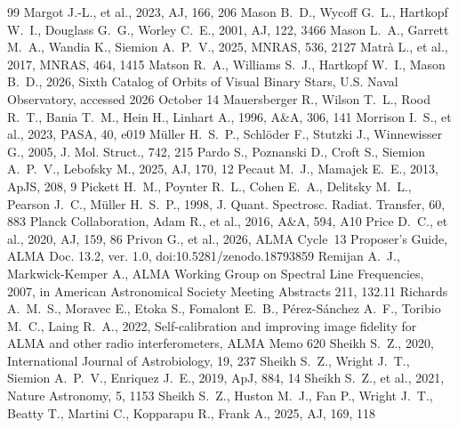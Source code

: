 \documentclass[twocolumn,twocolappendix,numberedappendix,appendixfloats]{openjournal}
\begin{document}
\begin{thebibliography}{99}
 Margot J.-L., et al., 2023, AJ, 166, 206
 Mason B.~D., Wycoff G.~L., Hartkopf W.~I., Douglass G.~G., Worley C.~E., 2001, AJ, 122, 3466
 Mason L.~A., Garrett M.~A., Wandia K., Siemion A.~P.~V., 2025, MNRAS, 536, 2127
 Matrà L., et al., 2017, MNRAS, 464, 1415
 Matson R.~A., Williams S.~J., Hartkopf W.~I., Mason B.~D., 2026, Sixth Catalog of Orbits of Visual Binary Stars, U.S. Naval Observatory, accessed 2026 October 14
 Mauersberger R., Wilson T.~L., Rood R.~T., Bania T.~M., Hein H., Linhart A., 1996, A\&A, 306, 141
 Morrison I.~S., et al., 2023, PASA, 40, e019
 M\"uller H.~S.~P., Schl\"oder F., Stutzki J., Winnewisser G., 2005, J. Mol. Struct., 742, 215
 Pardo S., Poznanski D., Croft S., Siemion A.~P.~V., Lebofsky M., 2025, AJ, 170, 12
 Pecaut M.~J., Mamajek E.~E., 2013, ApJS, 208, 9
 Pickett H.~M., Poynter R.~L., Cohen E.~A., Delitsky M.~L., Pearson J.~C., M\"uller H.~S.~P., 1998, J. Quant. Spectrosc. Radiat. Transfer, 60, 883
 Planck Collaboration, Adam R., et al., 2016, A\&A, 594, A10
 Price D.~C., et al., 2020, AJ, 159, 86
 Privon G., et al., 2026, ALMA Cycle~13 Proposer's Guide, ALMA Doc. 13.2, ver. 1.0, doi:10.5281/zenodo.18793859
 Remijan A.~J., Markwick-Kemper A., ALMA Working Group on Spectral Line Frequencies, 2007, in American Astronomical Society Meeting Abstracts 211, 132.11
 Richards A.~M.~S., Moravec E., Etoka S., Fomalont E.~B., P\'erez-S\'anchez A.~F., Toribio M.~C., Laing R.~A., 2022, Self-calibration and improving image fidelity for ALMA and other radio interferometers, ALMA Memo 620
 Sheikh S.~Z., 2020, International Journal of Astrobiology, 19, 237
 Sheikh S.~Z., Wright J.~T., Siemion A.~P.~V., Enriquez J.~E., 2019, ApJ, 884, 14
 Sheikh S.~Z., et al., 2021, Nature Astronomy, 5, 1153
 Sheikh S.~Z., Huston M.~J., Fan P., Wright J.~T., Beatty T., Martini C., Kopparapu R., Frank A., 2025, AJ, 169, 118

\end{thebibliography}
\end{document}
